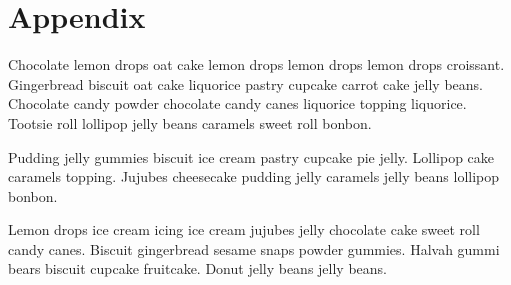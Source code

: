 \appendix

\section{Appendix}\label{appendix}

Chocolate lemon drops oat cake lemon drops lemon drops lemon drops
croissant. Gingerbread biscuit oat cake liquorice pastry cupcake carrot
cake jelly beans. Chocolate candy powder chocolate candy canes liquorice
topping liquorice. Tootsie roll lollipop jelly beans caramels sweet roll
bonbon.

Pudding jelly gummies biscuit ice cream pastry cupcake pie jelly.
Lollipop cake caramels topping. Jujubes cheesecake pudding jelly
caramels jelly beans lollipop bonbon.

Lemon drops ice cream icing ice cream jujubes jelly chocolate cake sweet
roll candy canes. Biscuit gingerbread sesame snaps powder gummies.
Halvah gummi bears biscuit cupcake fruitcake. Donut jelly beans jelly
beans.
